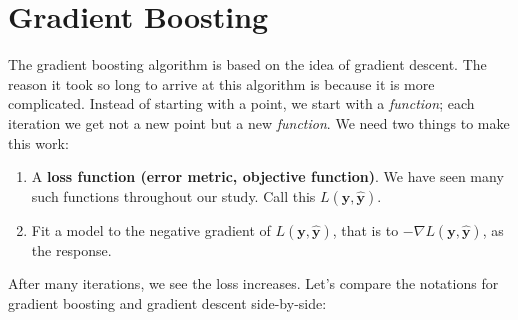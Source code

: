 \documentclass[12pt, a4paper]{article}
\theoremstyle{definition}
\begin{document}
	\section{Gradient Boosting}
	The gradient boosting algorithm is based on the idea of gradient descent.
	The reason it took so long to arrive at this algorithm is because it
	is more complicated. Instead of starting with a point, we start with
	a \textit{function}; each iteration we get not a new point but a new
	\textit{function}. We need two things to make this work:
	\begin{enumerate}[label=(\textbf{\arabic*})]
		\item A \textbf{loss function (error metric, objective function)}.
		We have seen many such functions throughout our study. Call this
		$L(\bm{y}, \hat{\bm{y}})$.
		\item Fit a model to the negative gradient of $L(\bm{y}, \hat{\bm{y}})$,
		that is to $-\nabla L(\bm{y}, \hat{\bm{y}})$,
		as the response.
	\end{enumerate}
	After many iterations, we see the loss increases. Let's compare the
	notations for gradient boosting and gradient descent side-by-side:
\end{document}
